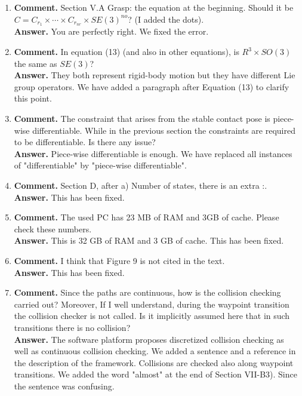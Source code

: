 \documentclass{article}
\begin{document}
\begin{enumerate}
\item \textbf{Comment.} Section V.A Grasp: the equation at the
  beginning. Should it be $C = C_{r_1} \times \cdots \times C_{r_{nr}} \times
  SE(3)^{no}$? (I added the dots).\\
  \textbf{Answer.} You are perfectly right. We fixed the error.

\item \textbf{Comment.} In equation (13) (and also in other
  equations), is $R^3 \times SO(3)$ the same as $SE(3)$?\\
  \textbf{Answer.} They both represent rigid-body motion but they have different
  Lie group operators. We have added a paragraph after Equation (13) to clarify
  this point.

\item \textbf{Comment.} The constraint that arises from the stable
  contact pose is piece-wise differentiable. While in the previous
  section the constraints are required to be differentiable. Is there
  any issue?\\
  \textbf{Answer.} Piece-wise differentiable is enough. We have replaced all
  instances of "differentiable" by "piece-wise differentiable".

\item \textbf{Comment.} Section D, after a) Number of states, there is an extra :.\\
  \textbf{Answer.} This has been fixed.

\item \textbf{Comment.}   The used PC has 23 MB of RAM and 3GB of cache. Please
  check these numbers.\\
  \textbf{Answer.} This is 32 GB of RAM and 3 GB of cache. This has been fixed.

\item \textbf{Comment.} I think that Figure 9 is not cited in the text.\\
  \textbf{Answer.} This has been fixed.
  
\item \textbf{Comment.}  Since the paths are continuous, how is the
  collision checking carried out? Moreover, If I well understand,
  during the waypoint transition the collision checker is not
  called. Is it implicitly assumed here that in such transitions there
  is no collision?\\
  \textbf{Answer.} The software platform proposes discretized collision checking
  as well as continuous collision checking. We added a sentence and a reference
  in the description of the framework. Collisions are checked also along
  waypoint transitions. We added the word "almost" at the end of Section VII-B3). Since the sentence was confusing.
\end{enumerate}
\end{document}
